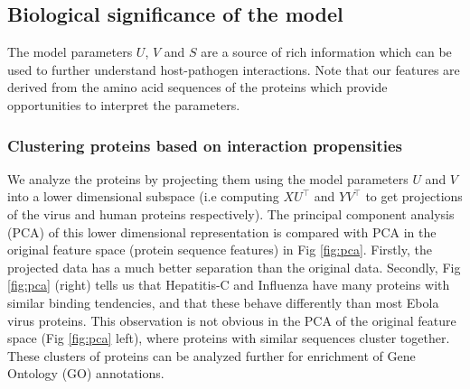 \documentclass[runningheads,a4paper]{llncs}
\begin{document}
\subsection{Biological significance of the model}
\label{bioanalysis}
The model parameters $U$, $V$ and $S$ are a source of rich information which can be used to further understand host-pathogen
interactions. Note that our features are derived from the amino acid sequences of the proteins which provide
opportunities to interpret the parameters.

\subsubsection{Clustering proteins based on interaction propensities}
We analyze the proteins by projecting them using the model parameters $U$ and $V$ into a lower dimensional subspace 
(i.e computing $X U^\intercal$ and $Y V^\intercal$ to get projections of the virus and human proteins respectively).  
The principal component analysis (PCA) of this lower dimensional representation is compared with PCA in the original feature space (protein sequence features) in Fig \ref{fig:pca}. 
Firstly, the projected data has a much better separation than the original data.
Secondly, Fig \ref{fig:pca} (right) tells us that Hepatitis-C and Influenza have many proteins with similar binding tendencies, and that these behave differently than most Ebola virus proteins. This observation is not obvious in the PCA of the original feature space (Fig \ref{fig:pca} left), where proteins with similar sequences cluster together.
These clusters of proteins can be analyzed further for enrichment of Gene Ontology (GO) annotations.


\end{document}
